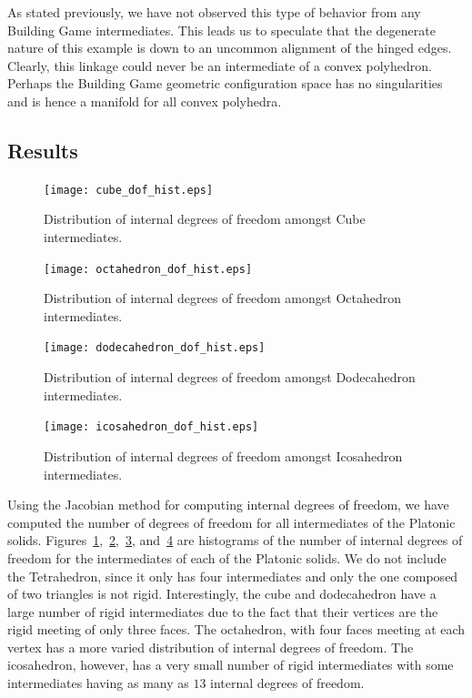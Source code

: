 As stated previously, we have not observed this type of behavior from any Building Game intermediates. This leads us to speculate that the degenerate nature of this example is down to an uncommon alignment of the hinged edges. Clearly, this linkage could never be an intermediate of a convex polyhedron. Perhaps the Building Game geometric configuration space has no singularities and is hence a manifold for all convex polyhedra.  

\subsection{Results}


\begin{figure}[ht]
\centering
  \texttt{[image: cube\_dof\_hist.eps]}
\caption{Distribution of internal degrees of freedom amongst Cube intermediates.}
\label{fig:CubeDoFHist}
\end{figure}

\begin{figure}[ht]
\centering
  \texttt{[image: octahedron\_dof\_hist.eps]}
\caption{Distribution of internal degrees of freedom amongst Octahedron intermediates.}
\label{fig:OctaDoFHist}
\end{figure}

\begin{figure}[ht]
\centering
  \texttt{[image: dodecahedron\_dof\_hist.eps]}
\caption{Distribution of internal degrees of freedom amongst Dodecahedron intermediates.}
\label{fig:DodecDoFHist}
\end{figure}

\begin{figure}[ht]
\centering
  \texttt{[image: icosahedron\_dof\_hist.eps]}
\caption{Distribution of internal degrees of freedom amongst Icosahedron intermediates.}
\label{fig:IcosaDoFHist}
\end{figure}

Using the Jacobian method for computing internal degrees of freedom, we have computed the number of degrees of freedom for all intermediates of the Platonic solids. Figures~\ref{fig:CubeDoFHist},~\ref{fig:OctaDoFHist},~\ref{fig:DodecDoFHist}, and~\ref{fig:IcosaDoFHist} are histograms of the number of internal degrees of freedom for the intermediates of each of the Platonic solids. We do not include the Tetrahedron, since it only has four intermediates and only the one composed of two triangles is not rigid. Interestingly, the cube and dodecahedron have a large number of rigid intermediates due  to the fact that their vertices are the rigid meeting of only three faces. The octahedron, with four faces meeting at each vertex has a more varied distribution of internal degrees of freedom. The icosahedron, however, has a very small number of rigid intermediates with some intermediates having as many as $13$ internal degrees of freedom. 


